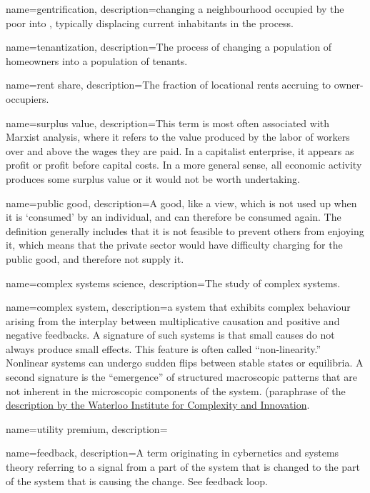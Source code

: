 {
name=gentrification,
description={changing a neighbourhood occupied by the poor into , typically displacing current inhabitants in the process.}
}

{
name=tenantization,
description={The process of changing a population of homeowners into a population of tenants. }
}

{
name=rent share,
description={The fraction of locational rents accruing to owner-occupiers.}
}

{
name=surplus value,
description={This term is most often associated with Marxist analysis, where it refers to the value produced by the labor of workers over and above the wages they are paid. In a capitalist enterprise, it appears as profit or profit before capital costs. In a more general sense, all economic activity produces some surplus value or it would not be worth undertaking.}
}

{
name=public good,
description={A good, like a view, which is not used up when it is `consumed' by an individual, and can therefore be consumed again. The definition generally includes that it is not feasible to prevent others from enjoying it, which means that the private sector would have difficulty charging for the public good, and therefore not supply it.}
}

{
name=complex systems science,
description={The study of \glspl{complex system}.}
}

{
name=complex system,
description={a system that exhibits complex behaviour arising from the interplay between multiplicative causation and positive and negative feedbacks.  A signature of such systems is that small causes do not always produce small effects. This feature is often called “non-linearity.” Nonlinear systems can undergo sudden flips between stable states or equilibria. A second signature is the “emergence” of structured macroscopic patterns that are not inherent in the  microscopic components of the system. (paraphrase of the \href{https://uwaterloo.ca/complexity-innovation/about/what-are-complex-systems}{description by the Waterloo Institute for Complexity and Innovation}.}
}

{
name=utility premium,
description={}
}

{
name=feedback,
description={A term originating in cybernetics and systems theory referring to a signal from a part of the system that is changed to the part of the system that is causing the change. See \gls{feedback loop}. }
}

